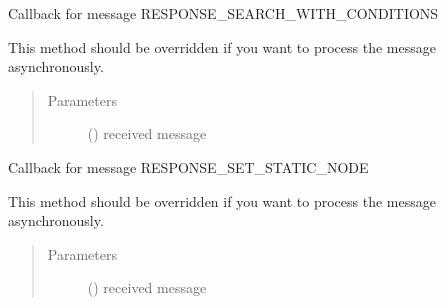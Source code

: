 \documentclass[letterpaper,10pt,english]{sphinxmanual}
\begin{document}
\begin{fulllineitems}
\begin{fulllineitems}
\begin{quote}
\begin{description}
\end{description}\end{quote}

\end{fulllineitems}


\begin{fulllineitems}
\label{\detokenize{bbc1.core.bbc_app:bbc1.core.bbc_app.Callback.proc_resp_search_with_condition}}
Callback for message RESPONSE\_SEARCH\_WITH\_CONDITIONS

This method should be overridden if you want to process the message asynchronously.
\begin{quote}\begin{description}
\item[{Parameters}] \leavevmode
{} () \textendash{} received message

\end{description}\end{quote}

\end{fulllineitems}


\begin{fulllineitems}
\label{\detokenize{bbc1.core.bbc_app:bbc1.core.bbc_app.Callback.proc_resp_set_neighbor}}
Callback for message RESPONSE\_SET\_STATIC\_NODE

This method should be overridden if you want to process the message asynchronously.
\begin{quote}\begin{description}
\item[{Parameters}] \leavevmode
{} () \textendash{} received message

\end{description}\end{quote}

\end{fulllineitems}



\end{fulllineitems}
\end{document}
